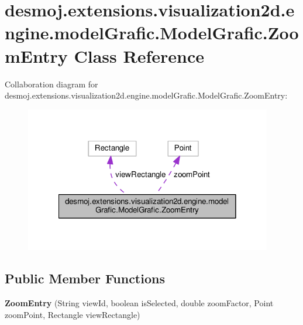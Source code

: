 \section{desmoj.\-extensions.\-visualization2d.\-engine.\-model\-Grafic.\-Model\-Grafic.\-Zoom\-Entry Class Reference}
\label{classdesmoj_1_1extensions_1_1visualization2d_1_1engine_1_1model_grafic_1_1_model_grafic_1_1_zoom_entry}


Collaboration diagram for desmoj.\-extensions.\-visualization2d.\-engine.\-model\-Grafic.\-Model\-Grafic.\-Zoom\-Entry\-:
\nopagebreak
\begin{figure}[H]
\begin{center}
\leavevmode
\includegraphics[width=306pt]{classdesmoj_1_1extensions_1_1visualization2d_1_1engine_1_1model_grafic_1_1_model_grafic_1_1_zoom_entry__coll__graph}
\end{center}
\end{figure}
\subsection*{Public Member Functions}
\begin{DoxyCompactItemize}
\item 
{\bfseries Zoom\-Entry} (String view\-Id, boolean is\-Selected, double zoom\-Factor, Point zoom\-Point, Rectangle view\-Rectangle)\label{classdesmoj_1_1extensions_1_1visualization2d_1_1engine_1_1model_grafic_1_1_model_grafic_1_1_zoom_entry_a87a92473c7e95de722afb95cafe96574}

\end{DoxyCompactItemize}
